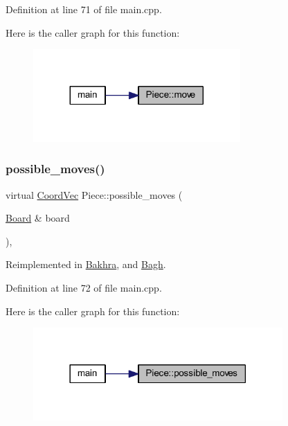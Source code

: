 Definition at line 71 of file main.\+cpp.

Here is the caller graph for this function\+:
\nopagebreak
\begin{figure}[H]
\begin{center}
\leavevmode
\includegraphics[width=224pt]{class_piece_a926422c76f09a9f0df374462ad8d13c1_icgraph}
\end{center}
\end{figure}
\mbox{\label{class_piece_aaf451c6593a2ed62f8ebe73ba13c0419}} 
\subsubsection{\texorpdfstring{possible\_moves()}{possible\_moves()}}
{\footnotesize\ttfamily virtual \mbox{\hyperlink{main_8cpp_a267937870648899c879128d3199195ec}{Coord\+Vec}} Piece\+::possible\+\_\+moves (\begin{DoxyParamCaption}\item[{\mbox{\hyperlink{class_board}{Board}} \&}]{board }\end{DoxyParamCaption})\hspace{0.3cm}{\ttfamily [inline]}, {\ttfamily [virtual]}}



Reimplemented in \mbox{\hyperlink{class_bakhra_a1df8a0eaf723807f8293d97edf701d46}{Bakhra}}, and \mbox{\hyperlink{class_bagh_ad98b7e209113ed6e5932ad732283b66a}{Bagh}}.



Definition at line 72 of file main.\+cpp.

Here is the caller graph for this function\+:
\nopagebreak
\begin{figure}[H]
\begin{center}
\leavevmode
\includegraphics[width=270pt]{class_piece_aaf451c6593a2ed62f8ebe73ba13c0419_icgraph}
\end{center}
\end{figure}


